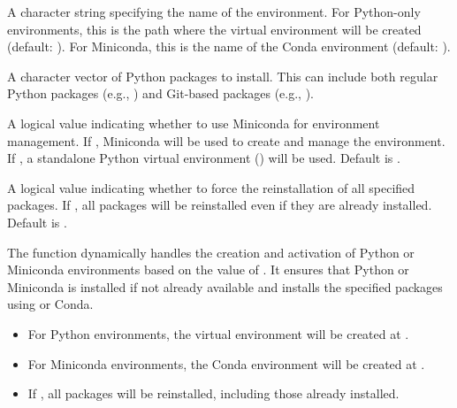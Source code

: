 \documentclass[letterpaper]{book}
\begin{document}
\begin{Arguments}
\begin{ldescription}
\item[\code{env\_name}] A character string specifying the name of the environment. For Python-only
environments, this is the path where the virtual environment will be created
(default: ). For Miniconda, this is the name of the Conda environment
(default: ).

\item[\code{packages}] A character vector of Python packages to install. This can include both
regular Python packages (e.g., ) and Git-based packages (e.g.,
).

\item[\code{use\_miniconda}] A logical value indicating whether to use Miniconda for environment management.
If , Miniconda will be used to create and manage the environment. If , a standalone
Python virtual environment () will be used. Default is .

\item[\code{force\_reinstall}] A logical value indicating whether to force the reinstallation of all specified
packages. If , all packages will be reinstalled even if they are already installed. Default is .
\end{ldescription}
\end{Arguments}
%
\begin{Details}
The function dynamically handles the creation and activation of Python or Miniconda environments
based on the value of . It ensures that Python or Miniconda is installed if not
already available and installs the specified packages using  or Conda.
\begin{itemize}

\item{} For Python environments, the virtual environment will be created at
.
\item{} For Miniconda environments, the Conda environment will be created at
.
\item{} If , all packages will be reinstalled, including those already installed.

\end{itemize}

\end{Details}
\end{document}
